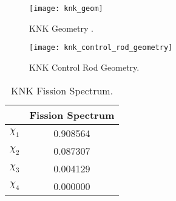     \begin{figure}
      \centering
      \texttt{[image: knk\_geom]}
      \caption{KNK Geometry \cite{takedaBenchmark}.}
      \label{fig:knk_geom}
    \end{figure}

    \begin{figure}
      \centering
      \texttt{[image: knk\_control\_rod\_geometry]}
      \caption{KNK Control Rod Geometry.}
      \label{fig:knk_cr_geom}
    \end{figure}
    
    \begin{table}
      \caption{KNK Fission Spectrum.}
      \label{tab:knkchi}
      \begin{center}
        \begin{tabular}{cc}
          \toprule
          &Fission Spectrum \\ 
          \midrule
          $\chi_1$&0.908564 \\
          $\chi_2$&0.087307 \\
          $\chi_3$&0.004129 \\
          $\chi_4$&0.000000 \\
          \bottomrule
        \end{tabular}
      \end{center}
    \end{table}

